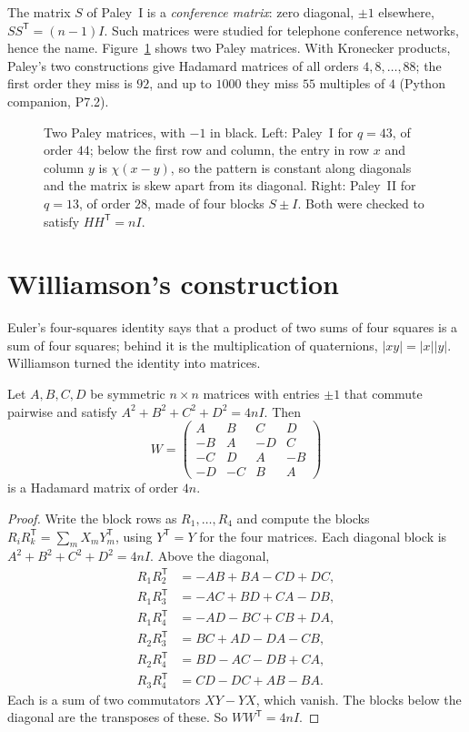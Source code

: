 The matrix $S$ of Paley~I is a \emph{conference matrix}: zero diagonal, $\pm1$ elsewhere, $SS^{\mathsf T}=(n-1)I$. Such matrices were studied for
telephone conference networks, hence the name. Figure~\ref{conjectures:fig:paley} shows two Paley matrices. With Kronecker products, Paley's two constructions give
Hadamard matrices of all orders $4,8,\dots,88$; the first order they miss is $92$, and up to $1000$ they miss $55$ multiples of $4$ (Python
companion, P7.2).

\begin{figure}[ht]
\centering
{}
\caption{Two Paley matrices, with $-1$ in black. Left: Paley~I for $q=43$, of order $44$; below the first row and column, the entry in row $x$ and
column $y$ is $\chi(x-y)$, so the pattern is constant along diagonals and the matrix is skew apart from its diagonal. Right: Paley~II for $q=13$, of
order $28$, made of four blocks $S\pm I$. Both were checked to satisfy $HH^{\mathsf T}=nI$.}
\label{conjectures:fig:paley}
\end{figure}

\section{Williamson's construction}

Euler's four-squares identity says that a product of two sums of four squares is a sum of four squares; behind it is the multiplication of
quaternions, $|xy|=|x||y|$. Williamson turned the identity into matrices.

\begin{theorem}[Williamson, 1944]\label{conjectures:thm:williamson}
Let $A,B,C,D$ be symmetric $n\times n$ matrices with entries $\pm1$ that commute pairwise and satisfy $A^2+B^2+C^2+D^2=4nI$. Then
\[
W=\begin{pmatrix}A&B&C&D\\-B&A&-D&C\\-C&D&A&-B\\-D&-C&B&A\end{pmatrix}
\]
is a Hadamard matrix of order $4n$.
\end{theorem}
\begin{proof}
Write the block rows as $R_1,\dots,R_4$ and compute the blocks $R_iR_k^{\mathsf T}=\sum_mX_mY_m^{\mathsf T}$, using $Y^{\mathsf T}=Y$ for the four
matrices. Each diagonal block is $A^2+B^2+C^2+D^2=4nI$. Above the diagonal,
\begin{align*}
R_1R_2^{\mathsf T}&=-AB+BA-CD+DC,\\ R_1R_3^{\mathsf T}&=-AC+BD+CA-DB,\\
R_1R_4^{\mathsf T}&=-AD-BC+CB+DA,\\ R_2R_3^{\mathsf T}&=BC+AD-DA-CB,\\
R_2R_4^{\mathsf T}&=BD-AC-DB+CA,\\ R_3R_4^{\mathsf T}&=CD-DC+AB-BA.
\end{align*}
Each is a sum of two commutators $XY-YX$, which vanish. The blocks below the diagonal are the transposes of these. So $WW^{\mathsf T}=4nI$.
\end{proof}

